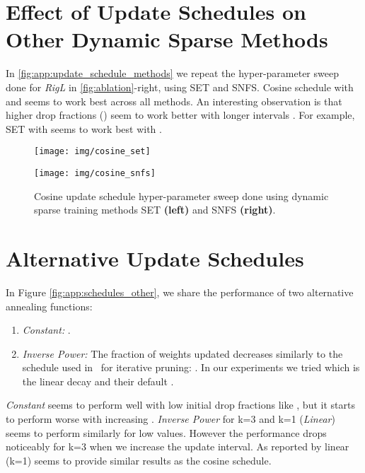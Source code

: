 \documentclass{article}
\begin{document}
\section{Effect of Update Schedules on Other Dynamic Sparse Methods}
\label{app:schedules}
In \autoref{fig:app:update_schedule_methods} we repeat the hyper-parameter sweep done for {\em RigL} in \autoref{fig:ablation}-right, using SET and SNFS. Cosine schedule with  and  seems to work best across all methods. An interesting observation is that higher drop fractions () seem to work better with longer intervals . For example, SET with  seems to work best with .

\begin{figure*}[ht]
\centering
\begin{minipage}{.5\textwidth}
  \centering
  \texttt{[image: img/cosine\_set]}
\end{minipage}\begin{minipage}{.5\textwidth}
  \centering
  \texttt{[image: img/cosine\_snfs]}
\end{minipage}
\caption{Cosine update schedule hyper-parameter sweep done using dynamic sparse training methods SET \textbf{(left)} and SNFS \textbf{(right)}.}
\label{fig:app:update_schedule_methods}
\end{figure*}

\section{Alternative Update Schedules}
\label{app:schedules_other}
In Figure \ref{fig:app:schedules_other}, we share the performance of two alternative annealing functions:
\begin{enumerate}
    \item \textit{Constant:} .
    \item \textit{Inverse Power:} The fraction of weights updated decreases similarly to the schedule used in~\cite{gupta2018} for iterative pruning: . In our experiments we tried  which is the linear decay and their default .
\end{enumerate}
\textit{Constant} seems to perform well with low initial drop fractions like , but it starts to perform worse with increasing . \textit{Inverse Power} for k=3 and k=1 (\textit{Linear}) seems to perform similarly for low  values. However the performance drops noticeably for k=3 when we increase the update interval. As reported by \cite{dettmers2019} linear (k=1) seems to provide similar results as the cosine schedule.
\end{document}
